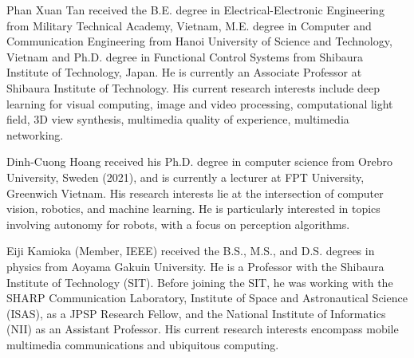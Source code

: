 \documentclass{ieeeaccess}
\begin{document}
\begin{IEEEbiography}{Phan Xuan Tan} received the B.E. degree in Electrical-Electronic Engineering from Military Technical Academy, Vietnam, M.E. degree in Computer and Communication Engineering from Hanoi University of Science and Technology, Vietnam and Ph.D. degree in Functional Control Systems from Shibaura Institute of Technology, Japan. He is currently an Associate Professor at Shibaura Institute of Technology. His current research interests include deep learning for visual computing, image and video processing, computational light field, 3D view synthesis, multimedia quality of experience, multimedia networking.
\end{IEEEbiography}

\begin{IEEEbiography}{Dinh-Cuong Hoang} received his Ph.D. degree in computer science from Orebro University, Sweden (2021), and is currently a lecturer at FPT University, Greenwich Vietnam. His research interests lie at the intersection of computer vision, robotics, and machine learning. He is particularly interested in topics involving autonomy for robots, with a focus on perception algorithms.
\end{IEEEbiography}

\begin{IEEEbiography}{Eiji Kamioka} (Member, IEEE) received the B.S., M.S., and D.S. degrees in physics from Aoyama Gakuin University. He is a Professor with the Shibaura Institute of Technology (SIT). Before joining the SIT, he was working with the SHARP Communication Laboratory, Institute of Space and Astronautical Science (ISAS), as a JPSP Research Fellow, and the National Institute of Informatics (NII) as an Assistant Professor. His current research interests encompass mobile multimedia communications and ubiquitous computing.
\end{IEEEbiography}



\EOD
\end{document}

